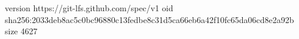 version https://git-lfs.github.com/spec/v1
oid sha256:2033deb8ac5c0bc96880c13fedbe8c31d5ca66eb6a42f10fc65da06cd8e2a92b
size 4627
